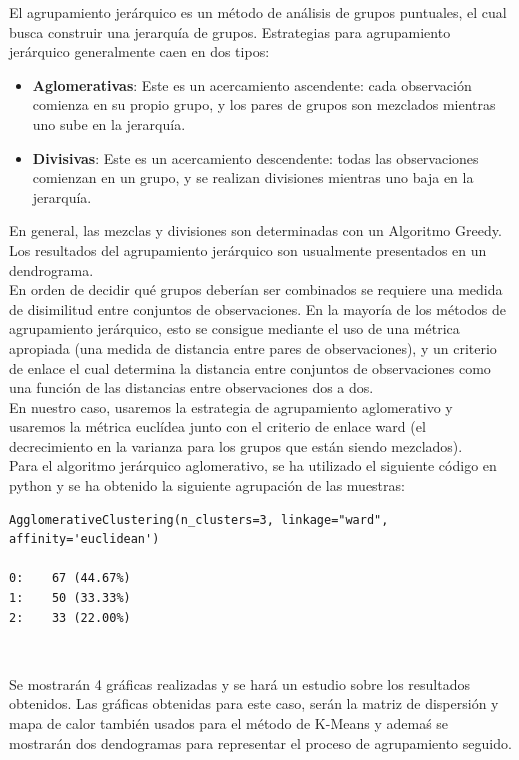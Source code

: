 \documentclass[a4paper, 20pt]{article}
\begin{document}
El agrupamiento jerárquico es un método de análisis de grupos puntuales, el cual busca construir una jerarquía de grupos. Estrategias para agrupamiento jerárquico generalmente caen en dos tipos: 

\begin{itemize}
\item \textbf{Aglomerativas}: Este es un acercamiento ascendente: cada observación comienza en su propio grupo, y los pares de grupos son mezclados mientras uno sube en la jerarquía.
\item \textbf{Divisivas}: Este es un acercamiento descendente: todas las observaciones comienzan en un grupo, y se realizan divisiones mientras uno baja en la jerarquía.
\end{itemize}

En general, las mezclas y divisiones son determinadas con un Algoritmo Greedy. Los resultados del agrupamiento jerárquico son usualmente presentados en un dendrograma.\\

En orden de decidir qué grupos deberían ser combinados se requiere una medida de disimilitud entre conjuntos de observaciones. En la mayoría de los métodos de agrupamiento jerárquico, esto se consigue mediante el uso de una métrica apropiada (una medida de distancia entre pares de observaciones), y un criterio de enlace el cual determina la distancia entre conjuntos de observaciones como una función de las distancias entre observaciones dos a dos.\\

En nuestro caso, usaremos la estrategia de agrupamiento aglomerativo y usaremos la métrica euclídea junto con el criterio de enlace ward (el decrecimiento en la varianza para los grupos que están siendo mezclados).\\

Para el algoritmo jerárquico aglomerativo, se ha utilizado el siguiente código en python y se ha obtenido la siguiente agrupación de las muestras:\\

\begin{lstlisting}
AgglomerativeClustering(n_clusters=3, linkage="ward", affinity='euclidean')

0:    67 (44.67%)
1:    50 (33.33%)
2:    33 (22.00%)
\end{lstlisting}\

Se mostrarán 4 gráficas realizadas y se hará un estudio sobre los resultados obtenidos. Las gráficas obtenidas para este caso, serán la matriz de dispersión y mapa de calor también usados para el método de K-Means y ademaś se mostrarán dos dendogramas para representar el proceso de agrupamiento seguido.\\
\end{document}
